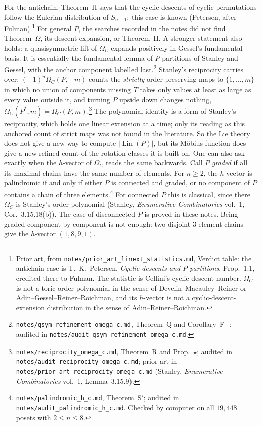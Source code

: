 \documentclass[11pt]{article}
\theoremstyle{definition}
\theoremstyle{remark}
\newcommand{\Lin}{\operatorname{Lin}}
\newcommand{\src}[1]{\nolinkurl{#1}}
\newcommand{\tagbox}[1]{\leavevmode\marginpar{\raggedright\fbox{\parbox{0.66in}{\centering\scriptsize\sffamily #1}}}}
\newcommand{\PROVEN}{\tagbox{PROVEN\\AUDITED}}
\newcommand{\KNOWN}{\tagbox{KNOWN\\(INSTANCE)}}
\begin{document}
For the antichain, Theorem~H says that the cyclic descents of cyclic
permutations follow the Eulerian distribution of $S_{n-1}$; this case is
known (Petersen, after Fulman).\footnote{Prior art, from
\src{notes/prior_art_linext_statistics.md}, Verdict table: the antichain
case is T.~K.~Petersen, \emph{Cyclic descents and $P$-partitions},
Prop.~1.1, credited there to Fulman. The statistic is Cellini's cyclic
descent number. $\Omega_C$ is not a toric order polynomial in the sense of
Develin--Macauley--Reiner or Adin--Gessel--Reiner--Roichman, and its
$h$-vector is not a cyclic-descent-extension distribution in the sense of
Adin--Reiner--Roichman.}\KNOWN{} For general $P$, the searches recorded in
the notes did not find Theorem~$\Omega$, its descent expansion, or
Theorem~H. A stronger statement also holds: a quasisymmetric lift of
$\Omega_C$ expands positively in Gessel's fundamental basis. It is
essentially the fundamental lemma of $P$-partitions of Stanley and
Gessel, with the anchor component labelled last.\PROVEN\footnote{\src{notes/qsym_refinement_omega_c.md},
Theorem~Q and Corollary~F+; audited in
\src{notes/audit_qsym_refinement_omega_c.md}.} Stanley's reciprocity carries over: $(-1)^n\Omega_C(P,-m)$
counts the \emph{strictly} order-preserving maps to $\{1,\dots,m\}$ in
which no union of components missing $T$ takes only values at least as
large as every value outside it, and turning $P$ upside down changes
nothing, $\Omega_C(P^*,m)=\Omega_C(P,m)$.\PROVEN\footnote{\src{notes/reciprocity_omega_c.md},
Theorem~R and Prop.~$\star$; audited in
\src{notes/audit_reciprocity_omega_c.md}; prior art in
\src{notes/prior_art_reciprocity_omega_c.md} (Stanley, \emph{Enumerative
Combinatorics} vol.~1, Lemma~3.15.9).} The polynomial identity is a form
of Stanley's reciprocity, which holds one linear extension at a time;
only its reading as this anchored count of strict maps was not found in
the literature. So the Lie theory does not give a new way to compute
$|\Lin(P)|$, but its M\"obius function does give a new refined count of
the rotation classes it is built on. One can also ask exactly when the $h$-vector of
$\Omega_C$ reads the same backwards. Call $P$ \emph{graded} if all its
maximal chains have the same number of elements. For $n\ge2$, the
$h$-vector is palindromic if and only if either $P$ is connected and
graded, or no component of $P$ contains a chain of three
elements.\PROVEN\footnote{\src{notes/palindromic_h_c.md}, Theorem~S$'$;
audited in \src{notes/audit_palindromic_h_c.md}. Checked by computer on all
$19{,}448$ posets with $2\le n\le8$.} For connected $P$ this is classical,
since there $\Omega_C$ is Stanley's order polynomial (Stanley,
\emph{Enumerative Combinatorics} vol.~1, Cor.~3.15.18(b)). The case of
disconnected $P$ is proved in these notes. Being graded component by
component is not enough: two disjoint $3$-element chains give the
$h$-vector $(1,8,9,1)$.
\end{document}
